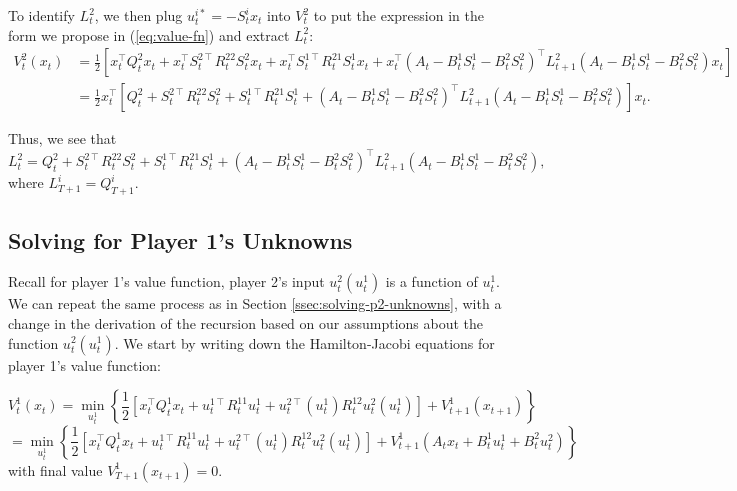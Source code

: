 \documentclass[11pt]{article}
\newcommand{\T}{\intercal}
\begin{document}
To identify $L^2_t$, we then plug $u^{i*}_t = -S^i_t x_t$ into $V^2_t$ to put the expression in the form we propose in (\ref{eq:value-fn}) and extract $L^2_t$:
\begin{align*}
V^2_t(x_{t}) &= \frac{1}{2}\left[ x_t^\T Q^2_t x_t + x_t^\T S_t^{2\T} R^{22}_t S^2_t x_t + x_t^\T S_t^{1\T} R^{21}_t S^1_t x_t + x_t^\T \left(A_t - B^1_t S^1_t - B^2_t S^2_t\right)^\T L^2_{t+1} \left(A_t - B^1_t S^1_t - B^2_t S^2_t\right) x_t \right] \\
    &= \frac{1}{2} x^\T_t \left[ Q^2_t + S_t^{2\T} R^{22}_t S^2_t + S^{1\T}_t R^{21}_t S^1_t + \left(A_t - B^1_t S^1_t - B^2_t S^2_t\right)^\T L^2_{t+1} \left(A_t - B^1_t S^1_t - B^2_t S^2_t\right) \right] x_t.
\end{align*}

Thus, we see that
\begin{equation}
\label{eq:L2t-recursion}
L^2_t = Q^2_t + S_t^{2\T} R^{22}_t S^2_t + S^{1\T}_t R^{21}_t S^1_t + \left(A_t - B^1_t S^1_t - B^2_t S^2_t\right)^\T L^2_{t+1} \left(A_t - B^1_t S^1_t - B^2_t S^2_t\right),
\end{equation}
where $L^i_{T+1} = Q^i_{T+1}$.


\subsection{Solving for Player 1's Unknowns}
\label{ssec:solving-p1-unknowns}

Recall for player 1's value function, player 2's input $u^2_t(u^1_t)$ is a function of $u^1_t$. We can repeat the same process as in Section \ref{ssec:solving-p2-unknowns}, with a change in the derivation of the recursion based on our assumptions about the function $u^2_t(u^1_t)$. We start by writing down the Hamilton-Jacobi equations for player 1's value function:

\begin{equation}
\label{eq:p1-hamilton-jacobi-eq}
V^1_t(x_{t}) = \min_{u^1_t} \left\{ \frac{1}{2} \left[ x_t^\T Q^1_t x_t + u^{1\T}_t R^{11}_t u^1_t + u^{2\T}_t(u^1_t) R^{12}_t u^2_t(u^1_t) \right] + V^1_{t+1}(x_{t+1}) \right\}
\end{equation}
\begin{equation}
\label{eq:p1-hamilton-jacobi-eq-expanded}
= \min_{u^1_t} \left\{ \frac{1}{2} \left[ x_t^\T Q^1_t x_t + u^{1\T}_t R^{11}_t u^1_t + u^{2\T}_t(u^1_t) R^{12}_t u^2_t(u^1_t) \right] + V^1_{t+1}(A_t x_t + B^{1}_t u^{1}_t + B^{2}_t u^{2}_t) \right\}
\end{equation}
with final value $V^1_{T+1}(x_{t+1}) = 0$.
\end{document}
